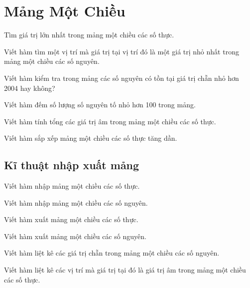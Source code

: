 
\chapter{Mảng Một Chiều}
\hypertarget{localtoc\thechapter}{}
\localtoc

\begin{problem}
    Tìm giá trị lớn nhất trong mảng một chiều các số thực.
\end{problem}
\begin{problem}
    Viết hàm tìm một vị trí mà giá trị tại vị trí đó là một giá trị nhỏ nhất trong mảng một chiều các số nguyên.
\end{problem}
\begin{problem}
    Viết hàm kiểm tra trong mảng các số nguyên có tồn tại giá trị chẵn nhỏ hơn 2004 hay không?
\end{problem}
\begin{problem}
    Viết hàm đếm số lượng số nguyên tố nhỏ hơn 100 trong mảng.
\end{problem}
\begin{problem}
    Viết hàm tính tổng các giá trị âm trong mảng một chiều các số thực.
\end{problem}
\begin{problem}
    Viết hàm sắp xếp mảng một chiều các số thực tăng dần.
\end{problem}


\section{Kĩ thuật nhập xuất mảng}
\begin{problem}
    Viết hàm nhập mảng một chiều các số thực.
\end{problem}
\begin{problem}
    Viết hàm nhập mảng một chiều các số nguyên.
\end{problem}
\begin{problem}
    Viết hàm xuất mảng một chiều các số thực.
\end{problem}
\begin{problem}
    Viết hàm xuất mảng một chiều các số nguyên.
\end{problem}
\begin{problem}
    Viết hàm liệt kê các giá trị chẵn trong mảng một chiều các số nguyên.
\end{problem}
\begin{problem}
    Viết hàm liệt kê các vị trí mà giá trị tại đó là giá trị âm trong mảng một chiều các số thực.
\end{problem}

